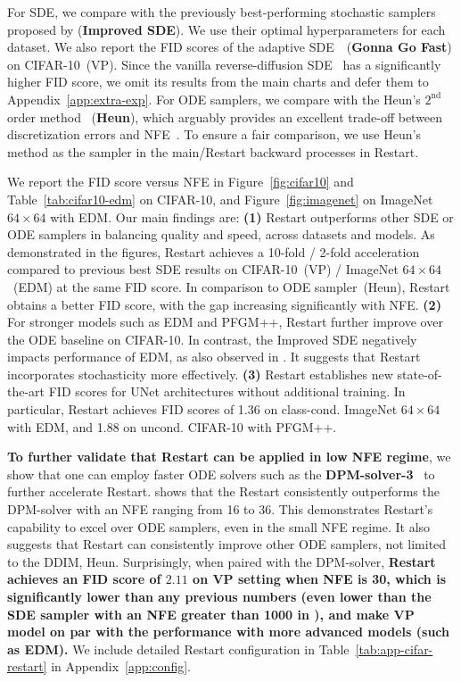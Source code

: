 For SDE, we compare with the previously best-performing stochastic samplers proposed by \cite{Karras2022ElucidatingTD} (\textbf{Improved SDE}). We use their optimal hyperparameters for each dataset. We also report the FID scores of the adaptive SDE~\cite{JolicoeurMartineau2021GottaGF}~(\textbf{Gonna Go Fast}) on CIFAR-10~(VP). Since the vanilla reverse-diffusion SDE~\cite{Song2020ScoreBasedGM} has a significantly higher FID score, we omit its results from the main charts and defer them to Appendix~\ref{app:extra-exp}. For ODE samplers, we compare with the Heun's $2^{\textrm{nd}}$ order method~\cite{Ascher1998ComputerMF} (\textbf{Heun}), which arguably provides an excellent trade-off between discretization errors and NFE~\cite{Karras2022ElucidatingTD}. To ensure a fair comparison, we use Heun's method as the sampler in the main/Restart backward processes in Restart. 


We report the FID score versus NFE in Figure~\ref{fig:cifar10} and Table~\ref{tab:cifar10-edm} on CIFAR-10, and Figure~\ref{fig:imagenet} on ImageNet $64\times 64$ with EDM. Our main findings are: \textbf{(1)} Restart outperforms other SDE or ODE samplers in balancing quality and speed, across datasets and models. As demonstrated in the figures, Restart achieves a 10-fold / 2-fold acceleration compared to previous best SDE results on CIFAR-10~(VP) / ImageNet $64\times 64$~(EDM) at the same FID score. In comparison to ODE sampler~(Heun), Restart obtains a better FID score, with the gap increasing significantly with NFE. \textbf{(2)} For stronger models such as EDM and PFGM++, Restart further improve over the ODE baseline on CIFAR-10. In contrast, the Improved SDE negatively impacts performance of EDM, as also observed in \cite{Karras2022ElucidatingTD}. It suggests that Restart incorporates stochasticity more effectively. \textbf{(3)} Restart establishes new state-of-the-art FID scores for UNet architectures without additional training. In particular, Restart achieves FID scores of 1.36 on class-cond. ImageNet $64\times 64$ with EDM, and 1.88 on uncond. CIFAR-10 with PFGM++.


\textbf{To further validate that Restart can be applied in low NFE regime}, we show that one can employ faster ODE solvers such as the \textbf{DPM-solver-3}~\cite{lu2022dpm} to further accelerate Restart.  shows that the Restart consistently outperforms the DPM-solver with an NFE ranging from 16 to 36. This demonstrates Restart's capability to excel over ODE samplers, even in the small NFE regime. It also suggests that Restart can consistently improve other ODE samplers, not limited to the DDIM, Heun. Surprisingly, when paired with the DPM-solver, \textbf{Restart achieves an FID score of $2.11$ on VP setting when NFE is 30, which is significantly lower than any previous numbers (even lower than the SDE sampler with an NFE greater than 1000
 in \cite{Song2020ScoreBasedGM}), and make VP model on par with the performance with more advanced models (such as EDM).} We include detailed Restart configuration in Table~\ref{tab:app-cifar-restart} in Appendix~\ref{app:config}.

